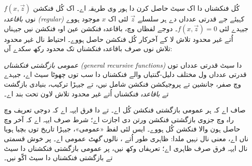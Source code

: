 \documentclass[../../../include/open-logic-section]{subfiles}
\begin{document}

کُل فنکشناں دا اک سیٹ حاصل کرن دا ہور وی
طریقہ اے۔ اک کُل فنکشن $f(x,\vec z)$ نوں
\emph{باقاعدہ (regular)} کہیئے جے قدرتی عدداں
دے ہر سلسلے $\vec z$ لئی اک $x$ موجود
ہووے جیہدے لئی $f(x,\vec z) = 0$۔ دوجے
لفظاں وچ، باقاعدہ فنکشن عین اوہ فنکشن نیں
جیہناں اُتے غیر محدود تلاش لا کے آخرکار کُل
فنکشن حاصل ہووے۔ احتیاط نال غیر محدود تلاش
نوں صرف باقاعدہ فنکشناں تک محدود رکھ سکدے آں:

\begin{defn}
\emph{عمومی بازگشتی فنکشناں (general recursive
functions)} دا سیٹ قدرتی عدداں توں قدرتی
عدداں ول مختلف دلیل-گنتیاں والے فنکشناں دا
سب توں چھوٹا سیٹ اے، جیہدے وچ صفر، جانشین
تے پروجیکشن فنکشن شامل نیں، تے جیہڑا ترکیب،
بنیادی بازگشت تے \emph{باقاعدہ} فنکشناں اُتے
غیر محدود تلاش لاون تحت بند اے۔
\end{defn}

صاف اے کہ ہر عمومی بازگشتی فنکشن کُل اے۔
 تے
 دا فرق ایہہ اے
کہ دوجی تعریف وچ راہ وچ جزوی بازگشتی فنکشن
ورتن دی اجازت اے؛ شرط صرف ایہہ اے کہ آخر
وچ حاصل ہون والا فنکشن کُل ہووے۔ ایس لئی لفظ
«عمومی»، جیہڑا تاریخ توں بچیا ہویا ناں اے،
معنی نال نہیں ملدا: ظاہری طور اُتے
،
 نالوں \emph{گھٹ}
عمومی اے۔ پر خوش قسمتی نال ایہہ فرق صرف
ظاہری اے؛ تعریفاں وکھ نیں، پر عمومی بازگشتی
فنکشناں دا سیٹ تے بازگشتی فنکشناں دا سیٹ
اکّو نیں۔
\end{document}
